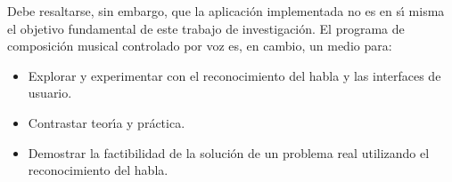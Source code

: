 Debe resaltarse, sin embargo, que la aplicaci\'on implementada no es en s{\'\i} misma el objetivo
fundamental de este trabajo de investigaci\'on. El programa de composici\'on musical controlado
por voz es, en cambio, un medio para:

\begin{itemize}
	\item Explorar y experimentar con el reconocimiento del habla y las interfaces de usuario.
	\item Contrastar teor{\'\i}a y pr\'actica.
	\item Demostrar la factibilidad de la soluci\'on de un problema real utilizando el
	reconocimiento del habla.
\end{itemize}